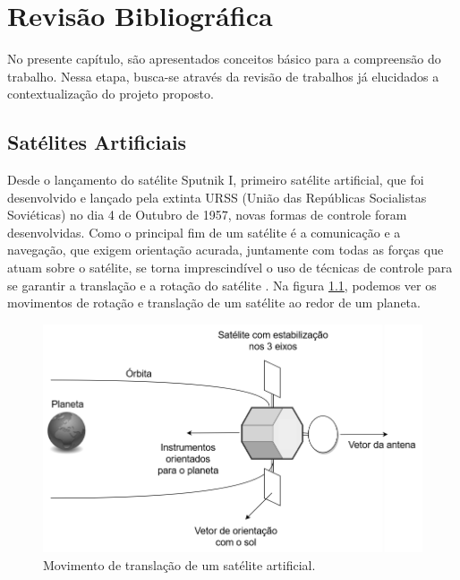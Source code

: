 \chapter{Revisão Bibliográfica}

No presente capítulo, são apresentados conceitos básico para a compreensão do trabalho. Nessa etapa, busca-se através da revisão de trabalhos já elucidados a contextualização do projeto proposto.



\section{Satélites Artificiais} %

Desde o lançamento do satélite Sputnik I, primeiro satélite artificial, que foi desenvolvido e lançado pela extinta URSS (União das Repúblicas Socialistas Soviéticas) no dia 4 de Outubro de 1957, novas formas de controle foram desenvolvidas. Como o principal fim de um satélite é a comunicação e a navegação, que exigem orientação acurada, juntamente com todas as forças que atuam sobre o satélite, se torna imprescindível o uso de técnicas de controle para se garantir a translação e a rotação do satélite \cite{Brown2002}. Na figura \ref{fig:rotational_brown_p256}, podemos ver os movimentos de rotação e translação de um satélite ao redor de um planeta.

\begin{figure}[H]
  \caption{Movimento de translação de um satélite artificial.}
  \begin{center}
      \includegraphics[scale=0.5]{referencial/img/rotational_brown_p256}
  \end{center}
  \label{fig:rotational_brown_p256}
\end{figure}


